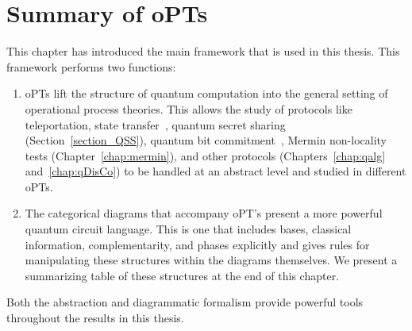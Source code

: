 \section{Summary of oPTs}

This chapter has introduced the main framework that is used in this thesis. This framework performs two functions:
\begin{enumerate}
\item oPTs lift the structure of quantum computation into the general setting of operational process theories. This allows the study of protocols like teleportation, state transfer~\cite{cqm-notes}, quantum secret sharing (Section~\ref{section_QSS}), quantum bit commitment~\cite{katriel-commitment}, Mermin non-locality tests (Chapter~\ref{chap:mermin}), and other protocols (Chapters~\ref{chap:qalg} and~\ref{chap:qDisCo}) to be handled at an abstract level and studied in different oPTs.
\item The categorical diagrams that accompany oPT's present a more powerful quantum circuit language. This is one that includes bases, classical information, complementarity, and phases explicitly and gives rules for manipulating these structures within the diagrams themselves. We present a summarizing table of these structures at the end of this chapter.
\end{enumerate}
Both the abstraction and diagrammatic formalism provide powerful tools throughout the results in this thesis.


